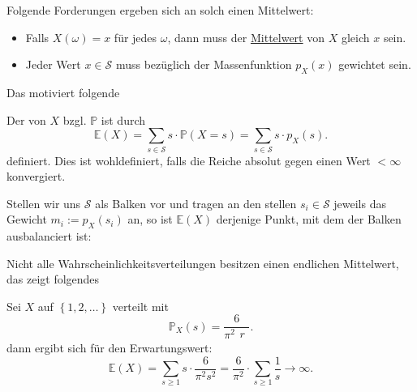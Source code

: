Folgende Forderungen ergeben sich an solch einen Mittelwert:
        \begin{itemize}
            \item Falls $X(\omega) = x$ für jedes $\omega$, dann muss der \underline{Mittelwert} von $X$ gleich  $x$ sein. 
            \item Jeder Wert $x\in \mathcal{S}$ muss bezüglich der Massenfunktion $p_X(x)$ gewichtet sein.
        \end{itemize}
        Das motiviert folgende
        \begin{definition}[Erwartungswert]\label{def:erwartungswert}
    Der  von $X$ bzgl.  $\mathbb{P}$ ist durch
    \[
        \mathbb{E}(X) = \sum_{s\in \mathcal{S}} s\cdot \mathbb{P}(X=s) = \sum_{s\in \mathcal{S}} s\cdot p_{X}(s)
    .\] 
    definiert. Dies ist wohldefiniert, falls die Reiche absolut gegen einen Wert $<\infty$ konvergiert.
\end{definition}
Stellen wir uns $\mathcal{S}$ als Balken vor und tragen an den stellen $s_i \in \mathcal{S}$ jeweils das Gewicht $m_i := p_X(s_i)$ an, so ist  $\mathbb{E}(X)$ derjenige Punkt, mit dem der Balken ausbalanciert ist: \\
\vspace{1em}
\begin{remark}
    Nicht alle Wahrscheinlichkeitsverteilungen besitzen einen endlichen Mittelwert, das zeigt folgendes
\end{remark}
\begin{example}
    Sei $X$ auf  $\left \{1,2,\ldots\right\} $ verteilt mit
    \[
        \mathbb{P}_X(s) = \frac{6}{\pi^2\substack{r} }
    .\] 
    dann ergibt sich für den Erwartungswert:
    \[
        \mathbb{E}(X) = \sum_{s\geq 1} s\cdot \frac{6}{\pi^2s^2} = \frac{6}{\pi^2} \cdot  \sum_{s\geq 1} \frac{1}{s}\to  \infty
    .\] 
\end{example}





